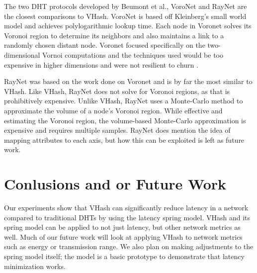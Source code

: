 \documentclass{IEEEtran}
\begin{document}
The two DHT protocols developed by Beumont et al., VoroNet \cite{voronet} and RayNet \cite{raynet} are the closest comparisons to VHash.
VoroNet is based off Kleinberg's small world model \cite{kleinberg2000navigation} and achieves polylogarithmic lookup time.  
Each node in Voronet solves its Voronoi region to determine its neighbors and also maintains a link to a randomly chosen distant node.
Voronet focused specifically on the two-dimensional Vornoi computations and the techniques used would be too expensive in higher dimensions and were not resilient to churn  \cite{raynet}.

RayNet \cite{raynet} was based on the work done on Voronet and is by far the most similar to VHash.  
Like VHash, RayNet does not solve for Voronoi regions, as that is prohibitively expensive.  
Unlike VHash, RayNet uses a Monte-Carlo method to approximate the volume of a node's Voronoi region.  
While effective and estimating the Voronoi region,  the volume-based Monte-Carlo approximation is expensive and requires multiple samples. 
RayNet does mention the idea of mapping attributes to each axis, but how this can be exploited is left as future work.



 

\section{Conlusions and or Future Work}

Our experiments show that VHash can significantly reduce latency in a network compared to traditional DHTs by using the latency spring model.  
VHash and its spring model can be applied to not just latency, but other network metrics as well.
Much of our future work will look at applying VHash to network metrics such as energy or transmission range.
We also plan on making adjustments to the spring model itself; the model is a basic prototype to demonstrate that latency minimization works.











\end{document}
